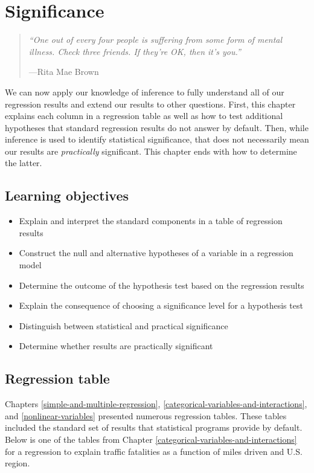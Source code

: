 \documentclass[
]{book}
\providecommand{\tightlist}{%
  \setlength{\itemsep}{0pt}\setlength{\parskip}{0pt}}
\begin{document}
\hypertarget{significance}{%
\chapter{Significance}\label{significance}}

\begin{quote}
\emph{``One out of every four people is suffering from some form of mental illness. Check three friends. If they're OK, then it's you.''}

---Rita Mae Brown
\end{quote}

We can now apply our knowledge of inference to fully understand all of our regression results and extend our results to other questions. First, this chapter explains each column in a regression table as well as how to test additional hypotheses that standard regression results do not answer by default. Then, while inference is used to identify statistical significance, that does not necessarily mean our results are \emph{practically} significant. This chapter ends with how to determine the latter.

\hypertarget{lo12}{%
\section{Learning objectives}\label{lo12}}

\begin{itemize}
\tightlist
\item
  Explain and interpret the standard components in a table of regression results
\item
  Construct the null and alternative hypotheses of a variable in a regression model
\item
  Determine the outcome of the hypothesis test based on the regression results
\item
  Explain the consequence of choosing a significance level for a hypothesis test
\item
  Distinguish between statistical and practical significance
\item
  Determine whether results are practically significant
\end{itemize}

\hypertarget{regression-table}{%
\section{Regression table}\label{regression-table}}

Chapters \ref{simple-and-multiple-regression}, \ref{categorical-variables-and-interactions}, and \ref{nonlinear-variables} presented numerous regression tables. These tables included the standard set of results that statistical programs provide by default. Below is one of the tables from Chapter \ref{categorical-variables-and-interactions} for a regression to explain traffic fatalities as a function of miles driven and U.S. region.
\end{document}
